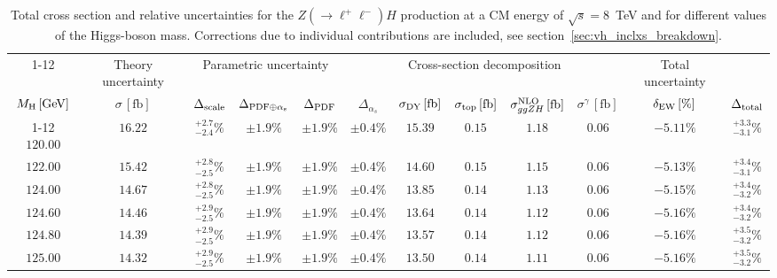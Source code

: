 \begin{landscape}
\begin{table}[ht!]
\caption{Total cross section and relative uncertainties for the $Z ( \rightarrow \ell^+ \ell^-) H$ production at a CM energy of  $\sqrt{s}=8$~TeV and for different values of the Higgs-boson mass. Corrections due to individual contributions are included, see section~\ref{sec:vh_inclxs_breakdown}.}
\label{tab:zh_lep_xs_8tev}
\centering
\scriptsize
{\renewcommand{\arraystretch}{1.4}
\begin{tabular}{| cc | c | ccc | ccccc | c |}
\cline{1-12}
\multicolumn{2}{|c|}{\(\sqrt{s} = 8\,\mathrm{TeV}\)} &
\multicolumn{1}{|c|}{Theory uncertainty} &
\multicolumn{3}{|c|}{Parametric uncertainty} &
\multicolumn{5}{|c|}{Cross-section decomposition} &
\multicolumn{1}{c|}{Total uncertainty} \\
\(M_\mathrm{H}\,[\mathrm{GeV}]\) & \(\sigma\,[\mathrm{fb}]\) &
\(\Delta_{\rm scale}\) &
\(\Delta_{\rm PDF\oplus\alpha_s}\) &
{\color{black!55}\(\Delta_{\rm PDF}\)} & {\color{black!55}\(\Delta_{\alpha_s}\)} &
\(\sigma_{\rm DY}\,[\mathrm{fb}]\) & \(\sigma_{\rm top}\,[\mathrm{fb}]\) & \(\sigma^{\rm NLO}_{ggZH}\,[\mathrm{fb}]\) & \(\sigma^\gamma\,[\mathrm{fb}]\) & \(\delta_{\rm EW}\,[\%]\) &
\(\Delta_{\rm total}\)
\\
\cline{1-12}
$120.00$ & $16.22$ & $^{+2.7}_{-2.4}\%$ & $\pm 1.9\%$ & {\color{black!55}$\pm 1.9\%$} & {\color{black!55}$\pm 0.4\%$} & $15.39$ & $0.15$ & $1.18$ & $0.06$ & $-5.11\%$ & $^{+3.3}_{-3.1}\%$ \\
$122.00$ & $15.42$ & $^{+2.8}_{-2.5}\%$ & $\pm 1.9\%$ & {\color{black!55}$\pm 1.9\%$} & {\color{black!55}$\pm 0.4\%$} & $14.60$ & $0.15$ & $1.15$ & $0.06$ & $-5.13\%$ & $^{+3.4}_{-3.1}\%$ \\
$124.00$ & $14.67$ & $^{+2.8}_{-2.5}\%$ & $\pm 1.9\%$ & {\color{black!55}$\pm 1.9\%$} & {\color{black!55}$\pm 0.4\%$} & $13.85$ & $0.14$ & $1.13$ & $0.06$ & $-5.15\%$ & $^{+3.4}_{-3.2}\%$ \\
$124.60$ & $14.46$ & $^{+2.9}_{-2.5}\%$ & $\pm 1.9\%$ & {\color{black!55}$\pm 1.9\%$} & {\color{black!55}$\pm 0.4\%$} & $13.64$ & $0.14$ & $1.12$ & $0.06$ & $-5.16\%$ & $^{+3.4}_{-3.2}\%$ \\
$124.80$ & $14.39$ & $^{+2.9}_{-2.5}\%$ & $\pm 1.9\%$ & {\color{black!55}$\pm 1.9\%$} & {\color{black!55}$\pm 0.4\%$} & $13.57$ & $0.14$ & $1.12$ & $0.06$ & $-5.16\%$ & $^{+3.5}_{-3.2}\%$ \\
$125.00$ & $14.32$ & $^{+2.9}_{-2.5}\%$ & $\pm 1.9\%$ & {\color{black!55}$\pm 1.9\%$} & {\color{black!55}$\pm 0.4\%$} & $13.50$ & $0.14$ & $1.11$ & $0.06$ & $-5.16\%$ & $^{+3.5}_{-3.2}\%$ \\

\end{tabular}}
\end{table}
\end{landscape}
